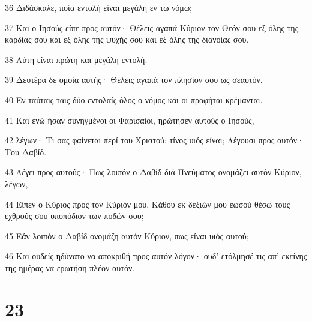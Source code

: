 \par 36 Διδάσκαλε, ποία εντολή είναι μεγάλη εν τω νόμω;
\par 37 Και ο Ιησούς είπε προς αυτόν· Θέλεις αγαπά Κύριον τον Θεόν σου εξ όλης της καρδίας σου και εξ όλης της ψυχής σου και εξ όλης της διανοίας σου.
\par 38 Αύτη είναι πρώτη και μεγάλη εντολή.
\par 39 Δευτέρα δε ομοία αυτής· Θέλεις αγαπά τον πλησίον σου ως σεαυτόν.
\par 40 Εν ταύταις ταις δύο εντολαίς όλος ο νόμος και οι προφήται κρέμανται.
\par 41 Και ενώ ήσαν συνηγμένοι οι Φαρισαίοι, ηρώτησεν αυτούς ο Ιησούς,
\par 42 λέγων· Τι σας φαίνεται περί του Χριστού; τίνος υιός είναι; Λέγουσι προς αυτόν· Του Δαβίδ.
\par 43 Λέγει προς αυτούς· Πως λοιπόν ο Δαβίδ διά Πνεύματος ονομάζει αυτόν Κύριον, λέγων,
\par 44 Είπεν ο Κύριος προς τον Κύριόν μου, Κάθου εκ δεξιών μου εωσού θέσω τους εχθρούς σου υποπόδιον των ποδών σου;
\par 45 Εάν λοιπόν ο Δαβίδ ονομάζη αυτόν Κύριον, πως είναι υιός αυτού;
\par 46 Και ουδείς ηδύνατο να αποκριθή προς αυτόν λόγον· ουδ' ετόλμησέ τις απ' εκείνης της ημέρας να ερωτήση πλέον αυτόν.

\chapter{23}

